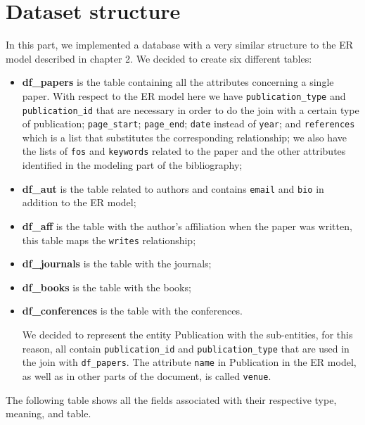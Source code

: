 \chapter{Dataset structure}
\label{ch:dataset_structure_spark}%
In this part, we implemented a database with a very similar structure to the ER model described in chapter 2.
We decided to create six different tables:
\begin{itemize}
    \item \textbf{df\_papers} is the table containing all the attributes concerning a single paper.
    With respect to the ER model here we have \verb|publication_type| and \verb|publication_id| that are necessary in order to do the join with a certain type of publication; \verb|page_start|; \verb|page_end|; \verb|date| instead of \verb|year|; and \verb|references| which is a list that substitutes the corresponding relationship;
    we also have the lists of \verb|fos| and \verb|keywords| related to the paper and the other attributes identified in the modeling part of the bibliography;
    \item \textbf{df\_aut} is the table related to authors and contains \verb|email| and \verb|bio| in addition to the ER model;
    \item \textbf{df\_aff} is the table with the author's affiliation when the paper was written, this table maps the
    \verb|writes| relationship;
    \item \textbf{df\_journals} is the table with the journals;
    \item \textbf{df\_books} is the table with the books;
    \item \textbf{df\_conferences} is the table with the conferences.

    We decided to represent the entity Publication with the sub-entities, for this reason, all contain \verb|publication_id|  and \verb|publication_type| that are used in the join with \verb|df_papers|.
    The attribute \verb|name| in Publication in the ER model, as well as in other parts of the document, is called \verb|venue|.
\end{itemize}
The following table shows all the fields associated with their respective type, meaning, and table.
